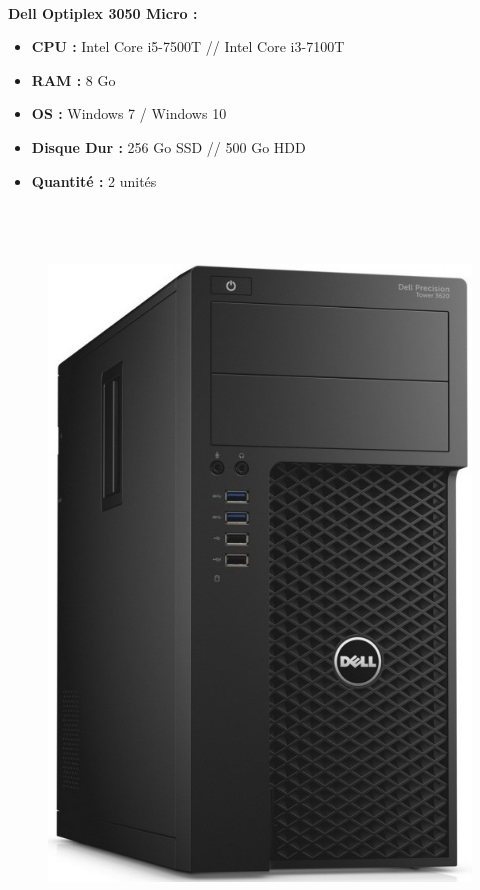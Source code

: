 \documentclass[11pt,a4paper,twoside]{article}
\begin{document}
\paragraph{}\textbf{Dell Optiplex 3050 Micro :} \\
\begin{itemize}
\item \textbf{CPU :} Intel Core i5-7500T // Intel Core i3-7100T
\item \textbf{RAM :} 8 Go
\item \textbf{OS :} Windows 7 / Windows 10
\item \textbf{Disque Dur :} 256 Go SSD // 500 Go HDD
\item \textbf{Quantité :} 2 unités
\\ \\ \\ \\
\end{itemize}
\begin{figure}
\includegraphics[scale=0.3]{Ressources/Materiel/3620.jpg}\vspace{-2cm}
\end{figure}
\end{document}
